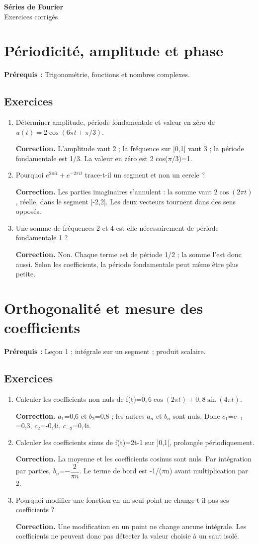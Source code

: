 \documentclass[11pt,a4paper]{article}
\newcommand{\editiontitle}[1]{\begin{center}{\Large\bfseries Séries de Fourier}\\[8pt]#1\end{center}}
\begin{document}
\editiontitle{Exercices corrigés}\tableofcontents\clearpage
\section{Périodicité, amplitude et phase}
\textbf{Prérequis :} Trigonométrie, fonctions et nombres complexes.
\subsection*{Exercices}\begin{enumerate}
\item Déterminer amplitude, période fondamentale et valeur en zéro de $u(t)=2\cos(6\pi t+\pi/3)$.
\par\textbf{Correction.} L’amplitude vaut 2 ; la fréquence sur [0,1] vaut 3 ; la période fondamentale est 1/3. La valeur en zéro est 2 cos($\pi$/3)=1.
\item Pourquoi $e^{2\pi it}+e^{-2\pi it}$ trace-t-il un segment et non un cercle ?
\par\textbf{Correction.} Les parties imaginaires s’annulent : la somme vaut $2\cos(2\pi t)$, réelle, dans le segment [-2,2]. Les deux vecteurs tournent dans des sens opposés.
\item Une somme de fréquences 2 et 4 est-elle nécessairement de période fondamentale 1 ?
\par\textbf{Correction.} Non. Chaque terme est de période 1/2 ; la somme l’est donc aussi. Selon les coefficients, la période fondamentale peut même être plus petite.
\end{enumerate}
\clearpage
\section{Orthogonalité et mesure des coefficients}
\textbf{Prérequis :} Leçon 1 ; intégrale sur un segment ; produit scalaire.
\subsection*{Exercices}\begin{enumerate}
\item Calculer les coefficients non nuls de f(t)=$0{,}6\cos(2\pi t)+0{,}8\sin(4\pi t)$.
\par\textbf{Correction.} $a_1$=0,6 et $b_2$=0,8 ; les autres $a_n$ et $b_n$ sont nuls. Donc $c_1$=$c_{-1}$=0,3, $c_2$=-0,4i, $c_{-2}$=0,4i.
\item Calculer les coefficients sinus de f(t)=2t-1 sur ]0,1[, prolongée périodiquement.
\par\textbf{Correction.} La moyenne et les coefficients cosinus sont nuls. Par intégration par parties, $b_n$=$-\dfrac2{\pi n}$. Le terme de bord est -1/($\pi$n) avant multiplication par 2.
\item Pourquoi modifier une fonction en un seul point ne change-t-il pas ses coefficients ?
\par\textbf{Correction.} Une modification en un point ne change aucune intégrale. Les coefficients ne peuvent donc pas détecter la valeur choisie à un saut isolé.
\end{enumerate}
\clearpage
\end{document}
